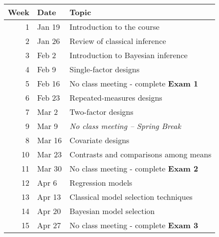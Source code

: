 \documentclass[10pt]{article}
\begin{document}
\begin{center}
\begin{tabular}{rll}
Week & Date & Topic\\
\hline
1 & Jan 19 & Introduction to the course\\
2 & Jan 26 & Review of classical inference\\
3 & Feb 2 & Introduction to Bayesian inference\\
4 & Feb 9 & Single-factor designs\\
5 & Feb 16 & No class meeting - complete \textbf{Exam 1}\\
6 & Feb 23 & Repeated-measures designs\\
7 & Mar 2 & Two-factor designs\\
9 & Mar 9 & \emph{No class meeting -- Spring Break}\\
8 & Mar 16 & Covariate designs\\
10 & Mar 23 & Contrasts and comparisons among means\\
11 & Mar 30 & No class meeting - complete \textbf{Exam 2}\\
12 & Apr 6 & Regression models\\
13 & Apr 13 & Classical model selection techniques\\
14 & Apr 20 & Bayesian model selection\\
15 & Apr 27 & No class meeting - complete \textbf{Exam 3}\\
\end{tabular}
\end{center}
\end{document}
